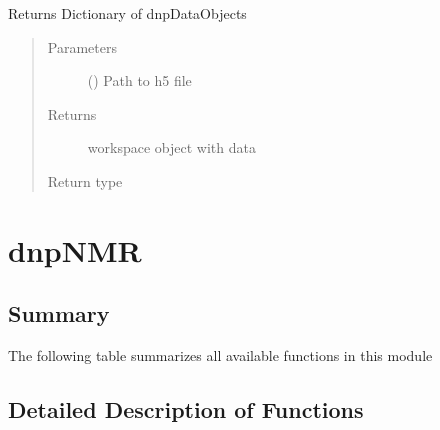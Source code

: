 \documentclass[letterpaper,10pt,english]{sphinxmanual}
\begin{document}
\begin{fulllineitems}
\label{\detokenize{dnpImport:dnpLab.dnpImport.h5.loadh5}}
Returns Dictionary of dnpDataObjects
\begin{quote}\begin{description}
\item[{Parameters}] \leavevmode
{} () \sphinxhyphen{}\sphinxhyphen{} Path to h5 file

\item[{Returns}] \leavevmode
workspace object with data

\item[{Return type}] \leavevmode
{\hyperref[\detokenize{dnpData:dnpLab.dnpdata_collection}]{}}

\end{description}\end{quote}

\end{fulllineitems}



\section{dnpNMR}
\label{\detokenize{dnpNMR:dnpnmr}}\label{\detokenize{dnpNMR:id1}}\label{\detokenize{dnpNMR::doc}}

\subsection{Summary}
\label{\detokenize{dnpNMR:summary}}
The following table summarizes all available functions in this module


\subsection{Detailed Description of Functions}
\label{\detokenize{dnpNMR:module-dnpLab.dnpNMR}}\label{\detokenize{dnpNMR:detailed-description-of-functions}}
\end{document}
